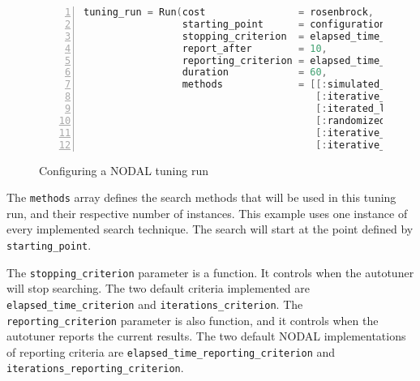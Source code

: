 \begin{figure}[htpb]
    \begin{minipage}{\linewidth}
    \begin{lstlisting}[language=C, basicstyle=\ttfamily\scriptsize,
        numbers=left,
        frame=no, showspaces=false, showstringspaces=false,
        numberstyle=\scriptsize,
        xleftmargin=1.5cm,
        keywords={%
            @spawnat, remotecall, Nullable, Any,
            @fetch, Future, Array, Float64, julia,
            while, true, function, end, put!,
            take!, sleep, RemoteChannel, Channel,
            Int, Tuple, const, addprocs, @schedule,
            @everywhere, for, in, myid, @async,
            remote_do, workers, Result, Real,
            AbstractFloat, deepcopy, rand, exp, true,
            Function, false, Run, mutable, struct,
            begin, Configuration, Dict, Symbol, using, import,
            FloatParameter,
            ResultChannel, AbstractChannel, return%
        },
        otherkeywords={::, \&, \*, +, -, /, [, ], >, <, put!, take!, neighbor!,
                       update!}
    ]
tuning_run = Run(cost                = rosenbrock,
                 starting_point      = configuration,
                 stopping_criterion  = elapsed_time_criterion,
                 report_after        = 10,
                 reporting_criterion = elapsed_time_reporting_criterion,
                 duration            = 60,
                 methods             = [[:simulated_annealing 1];
                                        [:iterative_first_improvement 1];
                                        [:iterated_local_search 1];
                                        [:randomized_first_improvement 1];
                                        [:iterative_probabilistic_improvement 1];
                                        [:iterative_greedy_construction 1];])
    \end{lstlisting}
    \end{minipage}
    \caption{Configuring a NODAL tuning run}
    \label{fig:nodal-tuningrun}
\end{figure}

The \texttt{methods} array defines the search methods that will be used in this
tuning run, and their respective number of instances. This example uses one
instance of every implemented search technique. The search will start at the
point defined by \texttt{starting\_point}.

The \texttt{stopping\_criterion} parameter is a function. It controls when the
autotuner will stop searching. The two default criteria implemented are
\texttt{elapsed\_time\_criterion} and \texttt{iterations\_criterion}.  The
\texttt{reporting\_criterion} parameter is also function, and it controls when
the autotuner reports the current results. The two default NODAL
implementations of reporting criteria are
\texttt{elapsed\_time\_reporting\_criterion} and
\texttt{iterations\_reporting\_criterion}.

